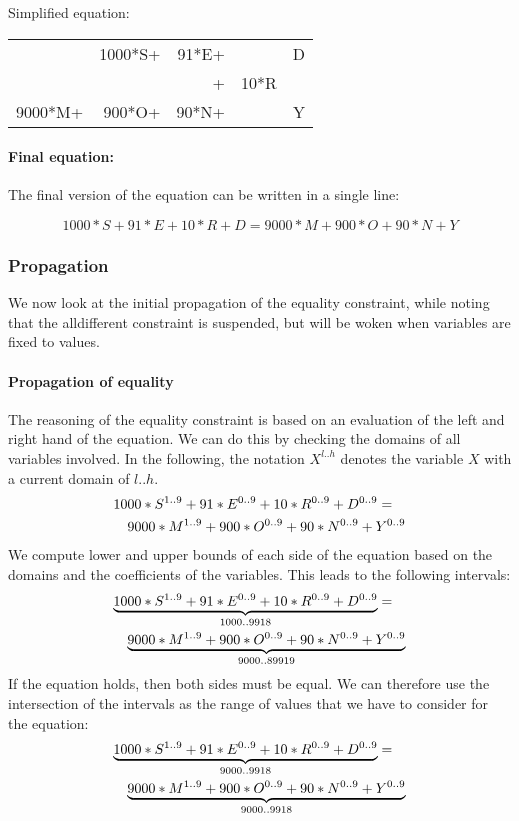 \documentclass[a4paper]{article}
\begin{document}
Simplified equation:

\begin{tabular}{rrrrr}
& 1000*S+ & 91*E+ &  & D \\
&  & + & 10*R &  \\ \hline
9000*M+ & 900*O+ & 90*N+ &  & Y
\end{tabular}

\paragraph{Final equation:}
The final version of the equation can be written in a single line:

\[
1000*S + 91*E + 10*R + D = 9000*M + 900*O+ 90*N + Y
\]



\subsubsection{Propagation}
We now look at the initial propagation of the equality constraint, while noting that the alldifferent constraint is suspended, but will be woken when variables are fixed to values.

\paragraph{Propagation of equality}

The reasoning of the equality constraint is based on an evaluation of the left and right hand of the equation. We can do this by checking the domains of all variables involved. In the following, the notation $X^{l..h}$ denotes the variable $X$ with a current domain of $l..h$.
\begin{eqnarray*}
\lefteqn{1000*S^{1..9} + 91*E^{0..9} + 10*R^{0..9} + D^{0..9}  =}\\ 
& & 9000*M^{1..9} + 900*O^{0..9}+ 90*N^{0..9} + Y^{0..9} 
\end{eqnarray*}
We compute lower and upper bounds of each side of the equation based on the domains and the coefficients of the variables. This leads to the following intervals:
\begin{eqnarray*}
\lefteqn{\underbrace{1000*S^{1..9} + 91*E^{0..9} + 10*R^{0..9} + D^{0..9}}_{1000..9918} =} \\
& & \underbrace{9000*M^{1..9} + 900*O^{0..9}+ 90*N^{0..9} + Y^{0..9}}_{9000..89919}
\end{eqnarray*}
If the equation holds, then both sides must be equal. We can therefore use the intersection of the intervals as the range of values that we have to consider for the equation:
\begin{eqnarray*}
\lefteqn{\underbrace{1000*S^{1..9} + 91*E^{0..9} + 10*R^{0..9} + D^{0..9}}_{9000..9918} =} \\
& & \underbrace{9000*M^{1..9} + 900*O^{0..9}+ 90*N^{0..9} + Y^{0..9}}_{9000..9918}
\end{eqnarray*}
\end{document}
